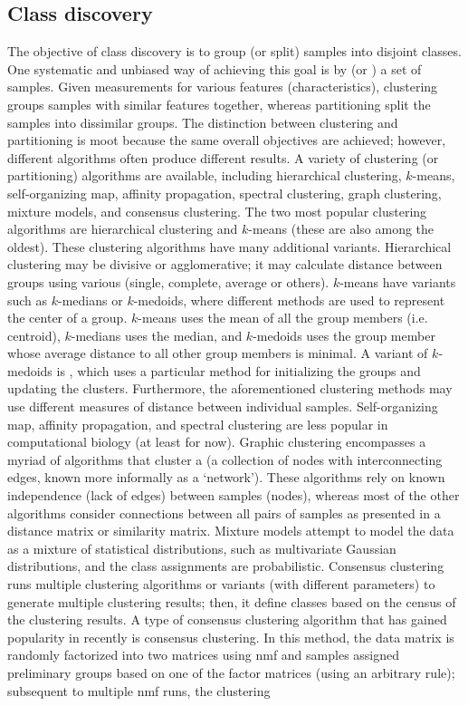 \subsection{Class discovery}

The objective of class discovery is to group (or split) samples into disjoint classes. One systematic and unbiased way of achieving this goal is by  (or ) a set of samples. Given measurements for various features (characteristics), clustering groups samples with similar features together, whereas partitioning split the samples into dissimilar groups. The distinction between clustering and partitioning is moot because the same overall objectives are achieved; however, different algorithms often produce different results.  A variety of clustering (or partitioning) algorithms are available, including hierarchical clustering, $k$-means, self-organizing map, affinity propagation, spectral clustering, graph clustering, mixture models, and consensus clustering. The two most popular clustering algorithms are hierarchical clustering and $k$-means (these are also among the oldest). These clustering algorithms have many additional variants. Hierarchical clustering may be divisive or agglomerative; it may calculate distance between groups using various  (single, complete, average or others). $k$-means have variants such as $k$-medians or $k$-medoids, where different methods are used to represent the center of a group. $k$-means uses the mean of all the group members (i.e. centroid), $k$-medians uses the median, and $k$-medoids uses the group member whose average distance to all other group members is minimal. A variant of $k$-medoids is , which uses a particular method for initializing the groups and updating the clusters. Furthermore, the aforementioned clustering methods may use different measures of distance between individual samples. Self-organizing map, affinity propagation, and spectral clustering are less popular in computational biology (at least for now). Graphic clustering encompasses a myriad of algorithms that cluster a  (a collection of nodes with interconnecting edges, known more informally as a `network'). These algorithms rely on known independence (lack of edges) between samples (nodes), whereas most of the other algorithms consider connections between all pairs of samples as presented in a distance matrix or similarity matrix. Mixture models attempt to model the data as a mixture of statistical distributions, such as multivariate Gaussian distributions, and the class assignments are probabilistic. Consensus clustering runs multiple clustering algorithms or variants (with different parameters) to generate multiple clustering results; then, it define classes based on the census of the clustering results. A type of consensus clustering algorithm that has gained popularity in recently is  consensus clustering. In this method, the data matrix is randomly factorized into two matrices using \gls{nmf} and samples assigned preliminary groups based on one of the factor matrices (using an arbitrary rule); subsequent to multiple \gls{nmf} runs, the clustering 